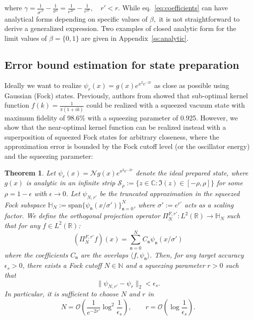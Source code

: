 \documentclass{article}
\newtheorem{theorem}{Theorem}
\begin{document}
where \(\gamma=\frac{1}{\sigma'^2}-\frac{1}{\sigma^2}=\frac{1}{e^{2r'}}-\frac{1}{e^{2r}},\quad r'<r\). While eq.~\eqref{eq:coefficients} can have analytical forms depending on specific values of $\beta,$ it is not straightforward to derive a generalized expression. Two examples of closed analytic form for the limit values of $\beta=\{0,1\}$ are given in Appendix~\ref{ss:analytic}.




















\subsection{Error bound estimation for state preparation}

Ideally we want to realize $\psi_r(x)=g(x)e^{x^2{e^{-2r}}}$ as close as possible using Gaussian (Fock) states. Previously, authors from \cite{Jin_2024} showed that sub-optimal kernel function $f(k)=\frac{1}{\pi(1+ik)}$ could be realized with a squeezed vacuum state with maximum fidelity of 98.6\% with a squeezing parameter of 0.925. However, we show that the near-optimal kernel function can be realized instead with a superposition of squeezed Fock states for arbitrary closeness, where the approximation error is bounded by the Fock cutoff level (or the oscillator energy) and the squeezing parameter:

\begin{theorem}
\label{thm: state-prep}
Let $\psi_r(x)=\mathcal{N}g(x)e^{x^2{e^{-2r}}}$ denote the ideal prepared state, where $g(x)$ is analytic in an infinite strip \(\mathcal{S}_{\rho} := \{ z \in \mathbb{C} : \Im(z) \in [-\rho, \rho] \}\) for some \(\rho=1-\epsilon\) with \(\epsilon\to0\). Let $\psi_{N,r'}$ be the truncated approximation in the squeezed Fock subspace $\mathbb H_N := \mathrm{span}\{\psi_{\mathfrak n}(x/\sigma')\}_{{\mathfrak n}=0}^N$, where $\sigma':=e^{r'}$ acts as a scaling factor. We define the orthogonal projection operator $\Pi^{F,r'}_N:L^2(\mathbb{R})\rightarrow \mathbb{H}_N$ such that for any $f\in L^2({\mathbb{R}})$: 
$$\left(\Pi_N^{F,r'} f\right)(x) = \sum_{\mathfrak{n}=0}^N C_{\mathfrak{n}} \psi_{\mathfrak{n}}(x/\sigma')$$
where the coefficients $C_{\mathfrak{n}}$ are the overlaps $\langle f, \psi_{\mathfrak{n}} \rangle$.
Then, for any target accuracy $\epsilon_s>0$,
there exists a Fock cutoff $N\in\mathbb{N}$ and a squeezing parameter $r>0$
such that
\[
\|\psi_{N,r'}-\psi_r\|_2 < \epsilon_s .
\]
In particular, it is sufficient to choose $N$ and $r$ in
\[
N = \mathcal O\!\left(\frac{1}{e^{-2r'}}\log^2 \frac{1}{\epsilon_s}\right),
\qquad
r = \mathcal O\!\left(\log \frac{1}{\epsilon_s}\right).
\]
\end{theorem}
\end{document}
